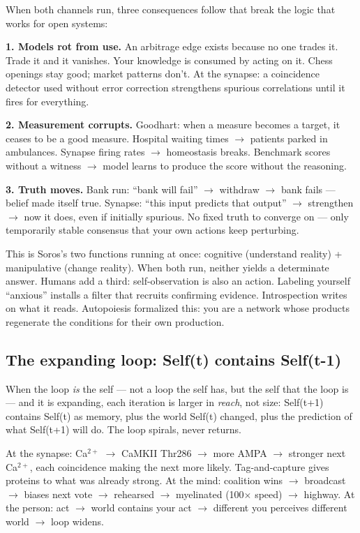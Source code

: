\documentclass[11pt]{article}
\begin{document}
When both channels run, three consequences follow that break the logic that works for open systems:

\textbf{1. Models rot from use.} An arbitrage edge exists because no one trades it. Trade it and it vanishes. Your knowledge is consumed by acting on it. Chess openings stay good; market patterns don't. At the synapse: a coincidence detector used without error correction strengthens spurious correlations until it fires for everything.

\textbf{2. Measurement corrupts.} Goodhart: when a measure becomes a target, it ceases to be a good measure. Hospital waiting times $\to$ patients parked in ambulances. Synapse firing rates $\to$ homeostasis breaks. Benchmark scores without a witness $\to$ model learns to produce the score without the reasoning.

\textbf{3. Truth moves.} Bank run: ``bank will fail'' $\to$ withdraw $\to$ bank fails --- belief made itself true. Synapse: ``this input predicts that output'' $\to$ strengthen $\to$ now it does, even if initially spurious. No fixed truth to converge on --- only temporarily stable consensus that your own actions keep perturbing.

This is Soros's two functions running at once: cognitive (understand reality) + manipulative (change reality). When both run, neither yields a determinate answer. Humans add a third: self-observation is also an action. Labeling yourself ``anxious'' installs a filter that recruits confirming evidence. Introspection writes on what it reads. Autopoiesis formalized this: you are a network whose products regenerate the conditions for their own production.

\subsection{The expanding loop: Self(t) contains Self(t-1)}

When the loop \emph{is} the self --- not a loop the self has, but the self that the loop is --- and it is expanding, each iteration is larger in \emph{reach}, not size: Self(t+1) contains Self(t) as memory, plus the world Self(t) changed, plus the prediction of what Self(t+1) will do. The loop spirals, never returns.

At the synapse: Ca$^{2+}$ $\to$ CaMKII Thr286 $\to$ more AMPA $\to$ stronger next Ca$^{2+}$, each coincidence making the next more likely. Tag-and-capture gives proteins to what was already strong. At the mind: coalition wins $\to$ broadcast $\to$ biases next vote $\to$ rehearsed $\to$ myelinated (100$\times$ speed) $\to$ highway. At the person: act $\to$ world contains your act $\to$ different you perceives different world $\to$ loop widens.
\end{document}

